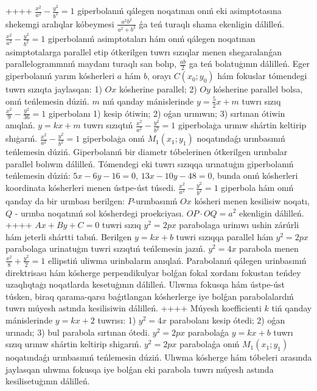 ++++
$\frac{x^2}{a^2}-\frac{y^2}{b^2}=1$ giperbolanıń qálegen noqatınan onıń eki asimptotasına shekemgi aralıqlar kóbeymesi $\frac{a^2 b^2}{a^2+b^2}$ ǵa teń turaqlı shama ekenligin dálilleń.
$\frac{x^2}{a^2}-\frac{y^2}{b^2}=1$ giperbolanıń asimptotaları hám onıń qálegen noqatınan asimptotalarga parallel etip ótkerilgen tuwrı sızıqlar menen shegaralanǵan parallelogrammnıń maydanı turaqlı san bolıp, $\frac{a b}{2}$ ga teń bolatuģının dálilleń.
Eger giperbolanıń yarım kósherleri $a$ hám $b$, orayı $C\left(x_0; y_0\right) $ hám fokuslar tómendegi tuwrı sızıqta jaylasqan: 1) $O x$ kósherine parallel; 2) $O y$ kósherine parallel bolsa, onıń teńlemesin dúziń.
$m$ nıń qanday mánislerinde $y=\frac{5}{2} x+m$ tuwrı sızıq $\frac{x^2}{9}-\frac{y^2}{36}=1$ giperbolanı 1) kesip ótiwin; 2) oǵan urınıwın; 3) sırtınan ótiwin anıqlań.
$y=k x+m$ tuwrı sızıqtıń $\frac{x^2}{a^2}-\frac{y^2}{b^2}=1$ giperbolaģa urınıw shártin keltirip shıģarıń.
$\frac{x^2}{a^2}-\frac{y^2}{b^2}=1$ giperbolaģa onıń $M_1\left(x_1; y_1\right) $ noqatındaǵı urınbasınıń teńlemesin dúziń.
Giperbolanıń bir diametr tóbelerinen ótkerilgen urınbalar parallel bolıwın dálilleń.
Tómendegi eki tuwrı sızıqqa urınatuģın giperbolanıń teńlemesin dúziń: $5x-6y-16=0$, $13x-10y-48=0$, bunda onıń kósherleri koordinata kósherleri menen ústpe-úst túsedi.
$\frac{x^2}{a^2}-\frac{y^2}{b^2}=1$ giperbola hám onıń qanday da bir urınbası berilgen: $P$-urınbasınıń $O x$ kósheri menen kesilisiw noqatı, $Q$ - urınba noqatınıń sol kósherdegi proekciyası. $O P \cdot O Q=a^2$ ekenligin dálilleń.
++++
$A x+B y+C=0$ tuwri sızıq $y^2=2 p x$ parabolaga urinıwı ushin zárúrli hám jeterli shártti tabıń.
Berilgen $y=k x+b$ tuwri sızıqqa parallel hám $y^2=2 p x$ parabolaga urinatuģın tuwri sızıqtıń teńlemesin jazıń.
$y^2=4 x$ parabola menen $\frac{x^2}{8}+\frac{y^2}{2}=1$ ellipstiń uliwma urinbaların anıqlań.
Parabolanıń qálegen urinbasınıń direktrisası hám kósherge perpendikulyar bolǵan fokal xordanı fokustan teńdey uzaqlıqtaģı noqatlarda kesetuģının dálilleń.
Ulıwma fokusqa hám ústpe-úst túsken, biraq qarama-qarsı baǵıtlangan kósherlerge iye bolǵan parabolalardıń tuwrı múyesh astında kesilisiwin dálilleń.
++++
Múyesh koefficienti $k$ tiń qanday mánislerinde $y=kx+2$ tuwrısı: 1) $y^2=4x$ parabolanı kesip ótedi; 2) oǵan urınadı; 3) bul parabola sırtınan ótedi.
$y^2=2 p x$ parabolaǵa $y=k x+b$ tuwrı sızıq urınıw shártin keltirip shigarıń.
$y^2=2 p x$ parabolaǵa onıń $M_1\left(x_1; y_1\right) $ noqatındaǵı urınbasınıń teńlemesin dúziń.
Ulıwma kósherge hám tóbeleri arasında jaylasqan ulıwma fokusqa iye bolǵan eki parabola tuwrı múyesh astında kesilisetuģının dálilleń.
